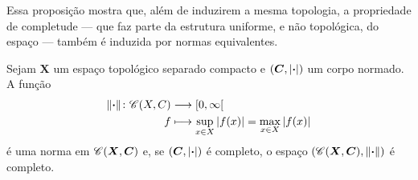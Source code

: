 Essa proposição mostra que, além de induzirem a mesma topologia, a propriedade de completude --- que faz parte da estrutura uniforme, e não topológica, do espaço --- também é induzida por normas equivalentes.

\begin{exercise}
Sejam $\bm X$ um espaço topológico separado compacto e $(\bm C,\left\vert{\bm{\cdot}}\right\vert)$ um corpo normado. A função
	\begin{align*}
	{\left\Vert{\bm{\cdot}}\right\Vert}\colon {\mathscr{C}(X,C)} &\longrightarrow {\left[0,\allowbreak \infty\right[} \\{f} &\longmapsto \sup_{x \in X} \left\vert{f(x)}\right\vert = \max_{x \in X} \left\vert{f(x)}\right\vert
	\end{align*}
é uma norma em $\mathscr{C}(\bm X,\bm C)$ e, se $(\bm C,\left\vert{\bm{\cdot}}\right\vert)$ é completo, o espaço $(\mathscr{C}(\bm X,\bm C),\left\Vert{\bm{\cdot}}\right\Vert)$ é completo.
\end{exercise}



